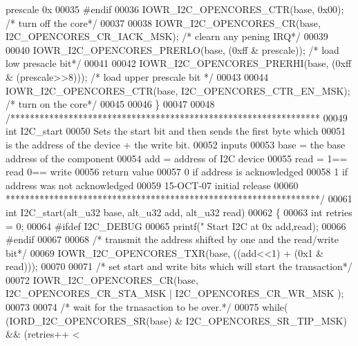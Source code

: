 \begin{DoxyCode}
{       prescale 0x%
00035 \textcolor{preprocessor}{#endif}
00036   IOWR_I2C_OPENCORES_CTR(base, 0x00); \textcolor{comment}{/* turn off the core*/}
00037 
00038   IOWR_I2C_OPENCORES_CR(base, I2C_OPENCORES_CR_IACK_MSK); \textcolor{comment}{/* clearn any pening IRQ*/}
00039 
00040   IOWR_I2C_OPENCORES_PRERLO(base, (0xff & prescale));  \textcolor{comment}{/* load low presacle bit*/}
00041 
00042   IOWR_I2C_OPENCORES_PRERHI(base, (0xff & (prescale>>8)));  \textcolor{comment}{/* load upper prescale bit */}
00043 
00044   IOWR_I2C_OPENCORES_CTR(base, I2C_OPENCORES_CTR_EN_MSK); \textcolor{comment}{/* turn on the core*/}
00045 
00046 \}
00047 
00048 \textcolor{comment}{/****************************************************************}
00049 \textcolor{comment}{int I2C\_start}
00050 \textcolor{comment}{            Sets the start bit and then sends the first byte which}
00051 \textcolor{comment}{            is the address of the device + the write bit.}
00052 \textcolor{comment}{inputs}
00053 \textcolor{comment}{      base = the base address of the component}
00054 \textcolor{comment}{      add = address of I2C device}
00055 \textcolor{comment}{      read =  1== read    0== write}
00056 \textcolor{comment}{return value}
00057 \textcolor{comment}{       0 if address is acknowledged}
00058 \textcolor{comment}{       1 if address was not acknowledged}
00059 \textcolor{comment}{15-OCT-07 initial release}
00060 \textcolor{comment}{*****************************************************************/}
00061 \textcolor{keywordtype}{int} I2C_start(alt_u32 base, alt_u32 add, alt_u32 read)
00062 \{
00063     \textcolor{keywordtype}{int} retries = 0;
00064 \textcolor{preprocessor}{#ifdef  I2C\_DEBUG}
00065         printf(\textcolor{stringliteral}{" Start  I2C at 0x%
      add,read);
00066 \textcolor{preprocessor}{#endif}
00067 
00068           \textcolor{comment}{/* transmit the address shifted by one and the read/write bit*/}
00069   IOWR_I2C_OPENCORES_TXR(base, ((add<<1) + (0x1 & read)));
00070 
00071           \textcolor{comment}{/* set start and write  bits which will start the transaction*/}
00072   IOWR_I2C_OPENCORES_CR(base, I2C_OPENCORES_CR_STA_MSK | I2C_OPENCORES_CR_WR_MSK );
00073 
00074           \textcolor{comment}{/* wait for the trnasaction to be over.*/}
00075   \textcolor{keywordflow}{while}( (IORD_I2C_OPENCORES_SR(base) & I2C_OPENCORES_SR_TIP_MSK) && (retries++ < 
}}
\end{DoxyCode}
